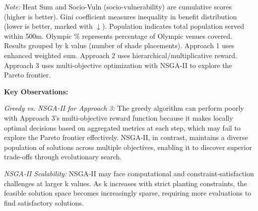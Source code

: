 \documentclass{article}
\begin{document}
\begin{table}[htbp]
\smallskip
\small
\textit{Note:} Heat Sum and Socio-Vuln (socio-vulnerability) are cumulative scores (higher is better). Gini coefficient measures inequality in benefit distribution (lower is better, marked with $\downarrow$). Population indicates total population served within 500m. Olympic \% represents percentage of Olympic venues covered. Results grouped by k value (number of shade placements). Approach 1 uses enhanced weighted sum. Approach 2 uses hierarchical/multiplicative reward. Approach 3 uses multi-objective optimization with NSGA-II to explore the Pareto frontier.
\end{table}

\vspace{0.3cm}

\noindent\textbf{Key Observations:}

\noindent\textit{Greedy vs. NSGA-II for Approach 3:} The greedy algorithm can perform poorly with Approach 3's multi-objective reward function because it makes locally optimal decisions based on aggregated metrics at each step, which may fail to explore the Pareto frontier effectively. NSGA-II, in contrast, maintains a diverse population of solutions across multiple objectives, enabling it to discover superior trade-offs through evolutionary search.

\noindent\textit{NSGA-II Scalability:} NSGA-II may face computational and constraint-satisfaction challenges at larger k values. As k increases with strict planting constraints, the feasible solution space becomes increasingly sparse, requiring more evaluations to find satisfactory solutions.
\end{document}
